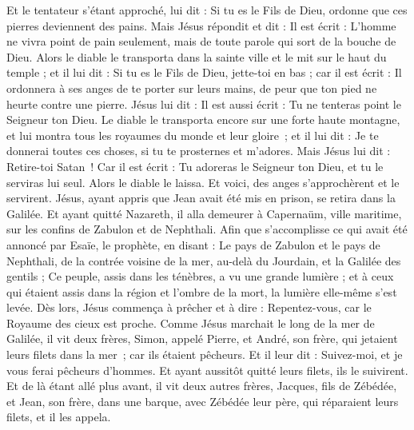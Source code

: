\begin{multicols}{2}
Et le tentateur s’étant approché, lui dit : Si tu es le Fils de Dieu, ordonne que ces pierres deviennent des pains.
Mais Jésus répondit et dit : Il est écrit : L'homme ne vivra point de pain seulement, mais de toute parole qui sort de la bouche de Dieu{}.
Alors le diable le transporta dans la sainte ville et le mit sur le haut du temple ;
et il lui dit : Si tu es le Fils de Dieu, jette-toi en bas ; car il est écrit : Il ordonnera à ses anges de te porter sur leurs mains, de peur que ton pied ne heurte contre une pierre{}.
Jésus lui dit : Il est aussi écrit : Tu ne tenteras point le Seigneur ton Dieu{}.
Le diable le transporta encore sur une forte haute montagne, et lui montra tous les royaumes du monde et leur gloire ;
et il lui dit : Je te donnerai toutes ces choses, si tu te prosternes et m'adores.
Mais Jésus lui dit : Retire-toi Satan ! Car il est écrit : Tu adoreras le Seigneur ton Dieu, et tu le serviras lui seul{}.
Alors le diable le laissa. Et voici, des anges s'approchèrent et le servirent.
Jésus, ayant appris que Jean avait été mis en prison, se retira dans la Galilée.
Et ayant quitté Nazareth, il alla demeurer à Capernaüm, ville maritime, sur les confins de Zabulon et de Nephthali.
Afin que s’accomplisse ce qui avait été annoncé par Esaïe, le prophète, en disant :
Le pays de Zabulon et le pays de Nephthali, de la contrée voisine de la mer, au-delà du Jourdain, et la Galilée des gentils ;
Ce peuple, assis dans les ténèbres, a vu une grande lumière ; et à ceux qui étaient assis dans la région et l'ombre de la mort, la lumière elle-même s'est levée{}.
Dès lors, Jésus commença à prêcher et à dire : Repentez-vous, car le Royaume des cieux est proche.
Comme Jésus marchait le long de la mer de Galilée, il vit deux frères, Simon, appelé Pierre, et André, son frère, qui jetaient leurs filets dans la mer ; car ils étaient pêcheurs.
Et il leur dit : Suivez-moi, et je vous ferai pêcheurs d'hommes.
Et ayant aussitôt quitté leurs filets, ils le suivirent.
Et de là étant allé plus avant, il vit deux autres frères, Jacques, fils de Zébédée, et Jean, son frère, dans une barque, avec Zébédée leur père, qui réparaient leurs filets, et il les appela.

\end{multicols}

